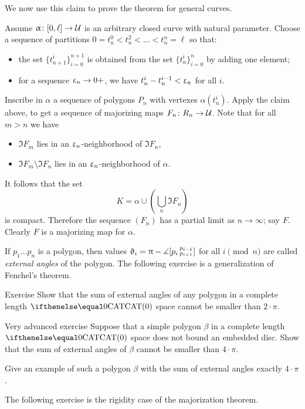 We now use this claim to prove the theorem for general curves.

Assume $\alpha\:[0,\ell]\to\spc{U}$ is an  arbitrary closed curve with natural parameter.
Choose a sequence of partitions $0=t^0_n<t^2_n<\dots<t^n_n=\ell$
so that:
\begin{itemize}
\item the set $\{t_{n+1}^i\}_{i=0}^{n+1}$ 
is obtained from the set  $\{t_n^i\}_{i=0}^n$ by adding one element;
\item for a sequence $\eps_n\to0+$,
we have $t^i_n-t^{i-1}_n<\upvarepsilon_n$ for all $i$.
\end{itemize}

Inscribe in $\alpha$ a sequence of polygons $P_n$ with vertexes $\alpha(t^i_n)$.
Apply the claim above, to get a sequence of majorizing maps $F_n\:R_n\to\spc{U}$.
Note that for all $m>n$ we have
\begin{itemize}
\item $\Im F_m$ lies in an  $\upvarepsilon_n$-neighborhood of $\Im F_n$,
\item $\Im F_m\setminus \Im F_n$ lies in an  $\upvarepsilon_n$-neighborhood of $\alpha$.
\end{itemize}
It follows that the set
\[K=\alpha\cup\left(\bigcup_n\Im F_n\right)\]
is compact.
Therefore the sequence $(F_n)$
has a partial limit as $n\to\infty$; 
say $F$.
Clearly $F$ is a majorizing map for $\alpha$.
\qeds

If $p_1\dots p_n$ is a polygon, then values $\upvartheta_i=\uppi-\measuredangle[p_i\,{}^{p_{i-1}}_{p_{i+1}}]$ for all $i\pmod n$ are called \emph{external angles} of the polygon.
The following exercise is a generalization of Fenchel's theorem.

\begin{thm}{Exercise}\label{ex:fenchel}
Show that the sum of external angles of any polygon in a complete length $\CAT0$ space cannot be smaller than $2\cdot\pi$. 
\end{thm}

\begin{thm}{Very advanced exercise}\label{ex:FM}
Suppose that a simple polygon $\beta$ in a complete length $\CAT0$ space does not bound an embedded disc.
Show that the sum of external angles of $\beta$ cannot be smaller than $4\cdot\pi$.

Give an example of such a polygon $\beta$ with the sum of external angles exactly $4\cdot\pi$.
\end{thm}

The following exercise is the rigidity case 
of the majorization theorem.

